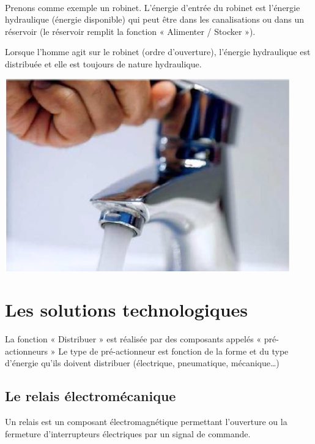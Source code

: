 \documentclass[10pt,fleqn]{article} %
\begin{document}
\begin{exemple}~


  \begin{minipage}{0.7\textwidth}
    Prenons comme exemple un robinet. L’énergie d’entrée du robinet est l’énergie hydraulique (énergie disponible) qui peut être dans les canalisations ou dans un réservoir (le réservoir remplit la fonction « Alimenter / Stocker »).

Lorsque l’homme agit sur le robinet (ordre d’ouverture), l’énergie hydraulique est distribuée et elle est toujours de nature hydraulique.
  \end{minipage}\hfill
  \begin{minipage}{0.2\textwidth}
    \includegraphics[width=\textwidth]{images/robinet}
  \end{minipage}
\end{exemple}

\section{Les solutions technologiques}

La fonction « Distribuer » est réalisée par des composants appelés « pré-actionneurs »
Le type de pré-actionneur est fonction de la forme et du type d’énergie qu’ils doivent distribuer (électrique, pneumatique, mécanique…)


\subsection{Le relais électromécanique}
Un relais est un composant électromagnétique permettant l’ouverture ou la fermeture d’interrupteurs électriques par un signal de commande.
\end{document}
